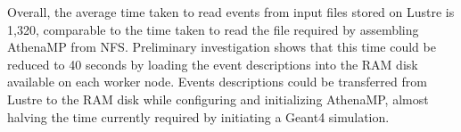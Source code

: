 Overall, the average time taken to read events from input files stored on
Lustre is 1,320, comparable to the time taken to read the file required by
assembling AthenaMP from NFS\@. Preliminary investigation shows that this
time could be reduced to 40 seconds by loading the event descriptions into
the RAM disk available on each worker node. Events descriptions could be
transferred from Lustre to the RAM disk while configuring and initializing
AthenaMP, almost halving the time currently required by initiating a Geant4
simulation.